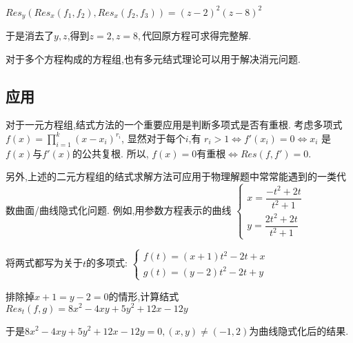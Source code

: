 	$ Res_y(Res_x(f_1,f_2),Res_x(f_2,f_3)) = (z-2)^2(z-8)^2$

	于是消去了$ y,z$,得到$ z=2,z=8,$代回原方程可求得完整解.

	对于多个方程构成的方程组,也有多元结式理论可以用于解决消元问题.\cite{ideals}

\subsection{应用}
	对于一元方程组,结式方法的一个重要应用是判断多项式是否有重根.
	考虑多项式$ f(x) = \prod_{i=1}^{k}{(x-x_i)^{r_i}}$,
	显然对于每个$ i$,有 $ r_i >1 \Leftrightarrow  f'(x_i) = 0 \Leftrightarrow x_i $ 是$f(x)$与$ f'(x)$的公共复根.
	所以, $ f(x)=0$有重根$ \Leftrightarrow Res(f,f')=0$.
	
	\vspace{5pt}
	另外,上述的二元方程组的结式求解方法可应用于物理解题中常常能遇到的一类代数曲面/曲线隐式化问题.
	例如,用参数方程表示的曲线
	$ \begin{cases}x=\dfrac{-t^2+2t}{t^2+1} \\ y=\dfrac{2t^2+2t}{t^2+1} \end{cases}$

	将两式都写为关于$ t$的多项式: 
	$\begin{cases}f(t)=(x+1)t^2 -2t +x\\ g(t)=(y-2)t^2-2t+y \end{cases}$

	\vspace{5pt}
	排除掉$ x+1=y-2=0$的情形,计算结式$ Res_t(f,g)= 8x^2-4xy+5y^2+12x-12y$ 
	
	于是$8x^2-4xy+5y^2+12x-12y=0,(x,y) \ne (-1,2)$为曲线隐式化后的结果.
